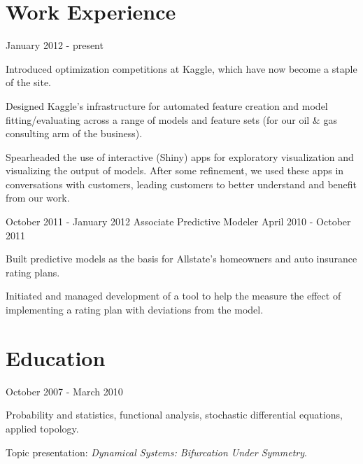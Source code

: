 \documentclass[letterpaper]{resume}
\author{David J. Chudzicki}
\begin{document}
\maketitle

\section{Work Experience}

{January 2012 - present}            


\begin{compactitem}
\item Introduced optimization competitions at Kaggle, which have now become a staple of the site.
\item Designed Kaggle's infrastructure for automated feature creation and model fitting/evaluating across a range of models and feature sets (for our oil \& gas consulting arm of the business).
\item Spearheaded the use of interactive (Shiny) apps for exploratory visualization and visualizing the output of models. After some refinement, we used these apps in conversations with customers, leading customers to better understand and benefit from our work.
\end{compactitem}


{October 2011 - January 2012}
{Associate Predictive Modeler}
{April 2010 - October 2011}


\begin{compactitem}
\item Built predictive models as the basis for Allstate's homeowners and auto insurance rating plans.
\item Initiated and managed development of a tool to help the measure the effect of implementing a rating plan with deviations from the model.
\end{compactitem}

\section{Education}

{October 2007 - March 2010}
{}
{}
\begin{compactitem}
\item Probability and statistics, functional analysis, stochastic differential equations, applied topology.
\item Topic presentation: \textit{Dynamical Systems: Bifurcation Under Symmetry}.      
\end{compactitem}
\end{document}
